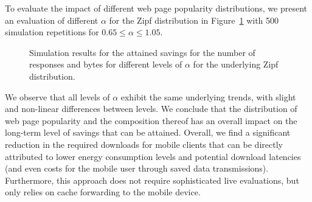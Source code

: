 \documentclass[letterpaper,journal,onecolumn,draftcls]{IEEEtran}
\begin{document}
To evaluate the impact of different web page popularity distributions, we present an evaluation of different $\alpha$ for the Zipf distribution in Figure~\ref{fig:sim3} with 500 simulation repetitions for $0.65 \le \alpha \le 1.05$.
\begin{figure}[]
	\centering
	\hfil
	\caption{Simulation results for the attained savings for the number of responses and bytes for different levels of $\alpha$ for the underlying Zipf distribution.}
	\label{fig:sim3}
\end{figure}
We observe that all levels of $\alpha$ exhibit the same underlying trends, with slight and non-linear differences between levels.
We conclude that the distribution of web page popularity and the composition thereof has an overall impact on the long-term level of savings that can be attained.
Overall, we find a significant reduction in the required downloads for mobile clients that can be directly attributed to lower energy consumption levels and potential download latencies (and even costs for the mobile user through saved data transmissions).
Furthermore, this approach does not require sophisticated live evaluations, but only relies on cache forwarding to the mobile device.
\end{document}
